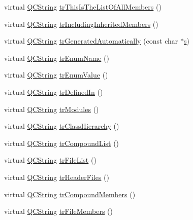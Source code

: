 \begin{DoxyCompactItemize}
\item 
virtual \hyperlink{class_q_c_string}{Q\+C\+String} \hyperlink{class_translator_norwegian_acf451810ff968f76cd5c729ce9540808}{tr\+This\+Is\+The\+List\+Of\+All\+Members} ()
\item 
virtual \hyperlink{class_q_c_string}{Q\+C\+String} \hyperlink{class_translator_norwegian_a91dc931102056f982b818724a0467a13}{tr\+Including\+Inherited\+Members} ()
\item 
virtual \hyperlink{class_q_c_string}{Q\+C\+String} \hyperlink{class_translator_norwegian_a6f6c402589db72a54a47c9e9e336a055}{tr\+Generated\+Automatically} (const char $\ast$\hyperlink{060__command__switch_8tcl_a011c73f2dbb87635a3b4206c72355f6e}{s})
\item 
virtual \hyperlink{class_q_c_string}{Q\+C\+String} \hyperlink{class_translator_norwegian_a04e9862bef83ebecd84588fe34f3c246}{tr\+Enum\+Name} ()
\item 
virtual \hyperlink{class_q_c_string}{Q\+C\+String} \hyperlink{class_translator_norwegian_a7b2dc9ecbf53486bbbed091e5686ad1d}{tr\+Enum\+Value} ()
\item 
virtual \hyperlink{class_q_c_string}{Q\+C\+String} \hyperlink{class_translator_norwegian_aad63bbbec277c04ed4d2e6f96e48ab3c}{tr\+Defined\+In} ()
\item 
virtual \hyperlink{class_q_c_string}{Q\+C\+String} \hyperlink{class_translator_norwegian_af296fbd95136709a9c6d0f0a3000598d}{tr\+Modules} ()
\item 
virtual \hyperlink{class_q_c_string}{Q\+C\+String} \hyperlink{class_translator_norwegian_a8b82605ff19493a2549e3946de02a076}{tr\+Class\+Hierarchy} ()
\item 
virtual \hyperlink{class_q_c_string}{Q\+C\+String} \hyperlink{class_translator_norwegian_ae4512251b3bf5e961cd39e4007daf159}{tr\+Compound\+List} ()
\item 
virtual \hyperlink{class_q_c_string}{Q\+C\+String} \hyperlink{class_translator_norwegian_a5b81b0c810a3c96109a245eb5cf61c7c}{tr\+File\+List} ()
\item 
virtual \hyperlink{class_q_c_string}{Q\+C\+String} \hyperlink{class_translator_norwegian_a112b93cfd3c13f5a7a35806c9898b8ec}{tr\+Header\+Files} ()
\item 
virtual \hyperlink{class_q_c_string}{Q\+C\+String} \hyperlink{class_translator_norwegian_a5fecba8518aa19f0ff8d78a3e7f6acc8}{tr\+Compound\+Members} ()
\item 
virtual \hyperlink{class_q_c_string}{Q\+C\+String} \hyperlink{class_translator_norwegian_a32c4b846f22c62e2813f5c481fd19833}{tr\+File\+Members} ()

\end{DoxyCompactItemize}
